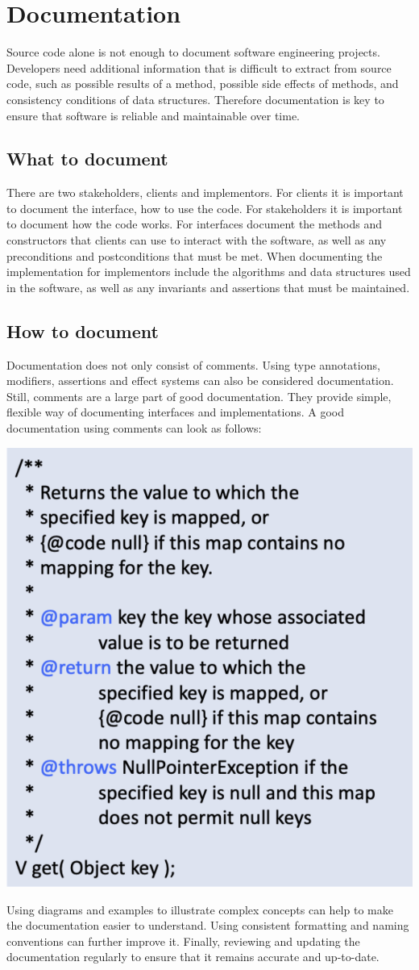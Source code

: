 \section{Documentation}

Source code alone is not enough to document software engineering projects. Developers need additional information that is difficult to extract from source code, such as possible results of a method, possible side effects of methods, and consistency conditions of data structures. Therefore documentation is key to ensure that software is reliable and maintainable over time.

\subsection{What to document}

There are two stakeholders, clients and implementors. For clients it is important to document the interface, how to use the code. For stakeholders it is important to document how the code works. For interfaces document the methods and constructors that clients can use to interact with the software, as well as any preconditions and postconditions that must be met. When documenting the implementation for implementors include the algorithms and data structures used in the software, as well as any invariants and assertions that must be maintained.

\subsection{How to document}

Documentation does not only consist of comments. Using type annotations, modifiers, assertions and effect systems can also be considered documentation. Still, comments are a large part of good documentation. They provide simple, flexible way of documenting interfaces and implementations. A good documentation using comments can look as follows:

\begin{center}
	\includegraphics[width=0.5\columnwidth]{assets/comment}
\end{center}

Using diagrams and examples to illustrate complex concepts can help to make the documentation easier to understand. Using consistent formatting and naming conventions can further improve it. Finally, reviewing and updating the documentation regularly to ensure that it remains accurate and up-to-date.